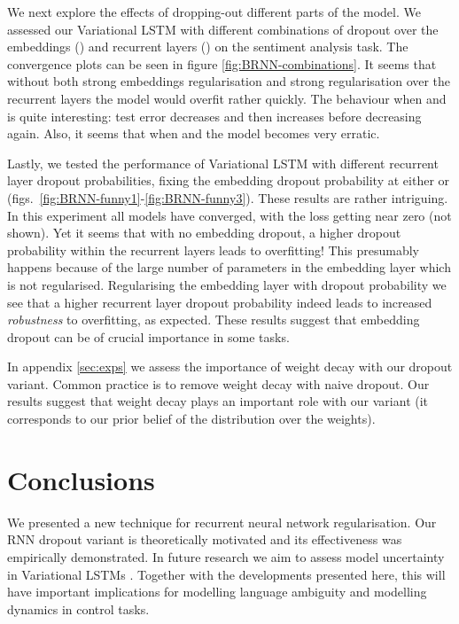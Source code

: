 \documentclass{article}
\theoremstyle{definition}
\begin{document}
We next explore the effects of dropping-out different parts of the model. 
We assessed our Variational LSTM with different combinations of dropout over the embeddings  () and recurrent layers () on the sentiment analysis task. The convergence plots can be seen in figure \ref{fig:BRNN-combinations}. It seems that without both strong embeddings regularisation and strong regularisation over the recurrent layers the model would overfit rather quickly. The behaviour when  and  is quite interesting: test error decreases and then increases before decreasing again. Also, it seems that when  and  the model becomes very erratic.

Lastly, we tested the performance of Variational LSTM with different recurrent layer dropout probabilities, fixing the embedding dropout probability at either  or  (figs.\ \ref{fig:BRNN-funny1}-\ref{fig:BRNN-funny3}). These results are rather intriguing. In this experiment all models have converged, with the loss getting near zero (not shown).
Yet it seems that with no embedding dropout, a higher dropout probability within the recurrent layers leads to overfitting! This presumably happens because of the large number of parameters in the embedding layer which is not regularised. Regularising the embedding layer with dropout probability  we see that a higher recurrent layer dropout probability indeed leads to increased \textit{robustness} to overfitting, as expected. These results suggest that embedding dropout can be of crucial importance in some tasks.

In appendix \ref{sec:exps} we assess the importance of weight decay with our dropout variant. Common practice is to remove weight decay with naive dropout. Our results suggest that weight decay plays an important role with our variant (it corresponds to our prior belief of the distribution over the weights). 





\section{Conclusions}
We presented a new technique for recurrent neural network regularisation. Our RNN dropout variant is theoretically motivated and its effectiveness was empirically demonstrated.
In future research we aim to assess model uncertainty in Variational LSTMs \citep{Gal2015DropoutB}. Together with the developments presented here, this will have important implications for modelling language ambiguity and modelling dynamics in control tasks.
\end{document}
